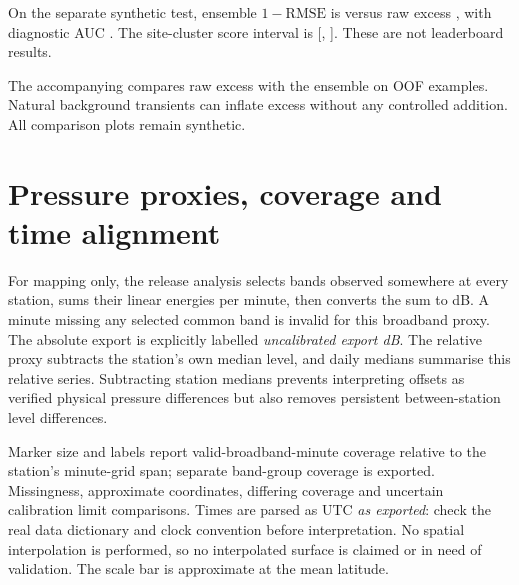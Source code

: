 \documentclass[a4paper,11pt]{article}
\newcommand{\synthetic}{SYNTHETIC EXAMPLE --- NOT REAL RESULTS.}
\begin{document}
\begin{table}[H]
\centering\small

\caption{\synthetic{} Site-held-out OOF performance. Cluster intervals
resample background windows, retaining repeated augmentation draws. Scores
are $1-\mathrm{RMSE}$; ensemble weights are selected on OOF predictions.}
\end{table}

On the separate synthetic test, ensemble $1-\mathrm{RMSE}$ is
\textbf{\HeldoutScore{}} versus raw excess \HeldoutBaseline{}, with diagnostic
AUC \HeldoutAUC{}. The site-cluster score interval is
[\HeldoutCILow{}, \HeldoutCIHigh{}]. These are not leaderboard results.

\begin{table}[H]
\centering\scriptsize
\resizebox{\linewidth}{!}{}
\caption{\synthetic{} Same-site-fold controls. Excess-only and received-energy
controls use isotonic regression; the other rows use LightGBM. Spectral-only
omits explicit temporal dispersion/quantile and trajectory features;
temporal-only uses total-level/trajectory features.}
\end{table}

The accompanying  compares raw excess with the
ensemble on OOF examples. Natural background transients can inflate excess
without any controlled addition. All comparison plots remain synthetic.

\newpage
\section{Pressure proxies, coverage and time alignment}
For mapping only, the release analysis selects bands observed somewhere at
every station, sums their linear energies per minute, then converts the sum
to dB. A minute missing any selected common band is invalid for this
broadband proxy. The absolute export is explicitly labelled
\emph{uncalibrated export dB}. The relative proxy subtracts the station's own
median level, and daily medians summarise this relative series. Subtracting
station medians prevents interpreting offsets as verified physical pressure
differences but also removes persistent between-station level differences.

Marker size and labels report valid-broadband-minute coverage relative to
the station's minute-grid span; separate band-group coverage is exported.
Missingness, approximate coordinates, differing coverage and uncertain
calibration limit comparisons. Times are parsed as UTC \emph{as exported}:
check the real data dictionary and clock convention before interpretation.
No spatial interpolation is performed, so no interpolated surface is claimed
or in need of validation. The scale bar is approximate at the mean latitude.
\end{document}
